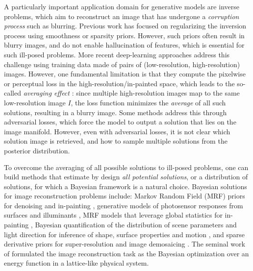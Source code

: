 \documentclass{article}
\begin{document}
A particularly important application domain for generative models are inverse problems, which aim to reconstruct an image that has undergone a \emph{corruption process} such as blurring. Previous work has focused on regularizing the inversion process using smoothness \cite{tikhonov1963solution} or sparsity \cite{figueiredo2005bound,mairal2009online,aharon2006k} priors. However, such priors often result in blurry images, and do not enable hallucination of features, which is essential for such ill-posed problems. More recent deep-learning approaches \cite{wang2018esrgan,li2019feedback,yu2018generative,yu2019free} address this challenge using training data made of pairs of (low-resolution, high-resolution) images. However, one fundamental limitation is that they compute the pixelwise or perceptual loss in the high-resolution/in-painted space, which leads to the so-called \emph{averaging effect} \cite{ledig2017photo}: since multiple high-resolution images map to the same low-resolution image $I$, the loss function minimizes the \emph{average} of all such solutions, resulting in a blurry image. Some methods \cite{ledig2017photo,pathak2016context} address this through adversarial losses, which force the model to output a solution that lies on the image manifold. However, even with adversarial losses, it is not clear which solution image is retrieved, and how to sample multiple solutions from the posterior distribution.

To overcome the averaging of all possible solutions to ill-posed problems, one can build methods that estimate by design \emph{all potential solutions}, or a distribution of solutions, for which a Bayesian framework is a natural choice. Bayesian solutions for image reconstruction problems include: Markov Random Field (MRF) priors for denoising and in-painting \cite{roth2005fields}, generative models of photosensor responses from surfaces and illuminants \cite{brainard1997bayesian}, MRF models that leverage global statistics for in-painting \cite{levin2003learning}, Bayesian quantification of the distribution of scene parameters and light direction for inference of shape, surface properties and motion \cite{freeman1994generic}, and sparse derivative priors for super-resolution and image demosaicing \cite{russell2003exploiting}. The seminal work of \cite{geman1984stochastic} formulated the image reconstruction task as the Bayesian optimization over an energy function in a lattice-like physical system. 
\end{document}
